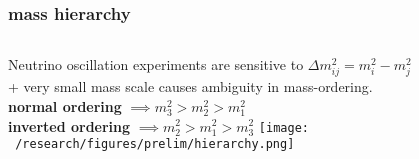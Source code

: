 \documentclass{beamer}
\begin{document}
	\begin{frame}
		\frametitle{mass hierarchy}
		\begin{columns}[c] %
			
			Neutrino oscillation experiments are sensitive to $\Delta m_{ij}^2 = m_i^2 - m_j^2$ 
			\\ + very small mass scale causes ambiguity in mass-ordering. \\
			\medskip
			\textbf{normal ordering} $\implies m_3^2 > m_2^2 > m_1^2$ \\
			\textbf{inverted ordering} $\implies m_2^2 > m_1^2 > m_3^2$
			\texttt{[image: ~/research/figures/prelim/hierarchy.png]}

			
		\end{columns}
	\end{frame}
	
	
		
	
%			
%			
	
\end{document}
